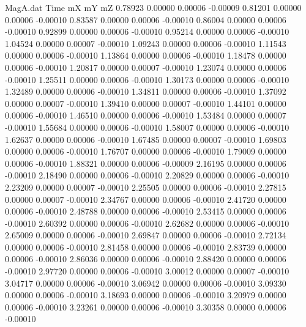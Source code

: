 \begin{filecontents}{MagA.dat}
Time mX mY mZ
   0.78923    0.00000    0.00006   -0.00009
   0.81201    0.00000    0.00006   -0.00010
   0.83587    0.00000    0.00006   -0.00010
   0.86004    0.00000    0.00006   -0.00010
   0.92899    0.00000    0.00006   -0.00010
   0.95214    0.00000    0.00006   -0.00010
   1.04524    0.00000    0.00007   -0.00010
   1.09243    0.00000    0.00006   -0.00010
   1.11543    0.00000    0.00006   -0.00010
   1.13864    0.00000    0.00006   -0.00010
   1.18478    0.00000    0.00006   -0.00010
   1.20817    0.00000    0.00007   -0.00010
   1.23074    0.00000    0.00006   -0.00010
   1.25511    0.00000    0.00006   -0.00010
   1.30173    0.00000    0.00006   -0.00010
   1.32489    0.00000    0.00006   -0.00010
   1.34811    0.00000    0.00006   -0.00010
   1.37092    0.00000    0.00007   -0.00010
   1.39410    0.00000    0.00007   -0.00010
   1.44101    0.00000    0.00006   -0.00010
   1.46510    0.00000    0.00006   -0.00010
   1.53484    0.00000    0.00007   -0.00010
   1.55684    0.00000    0.00006   -0.00010
   1.58007    0.00000    0.00006   -0.00010
   1.62637    0.00000    0.00006   -0.00010
   1.67485    0.00000    0.00007   -0.00010
   1.69803    0.00000    0.00006   -0.00010
   1.76707    0.00000    0.00006   -0.00010
   1.79009    0.00000    0.00006   -0.00010
   1.88321    0.00000    0.00006   -0.00009
   2.16195    0.00000    0.00006   -0.00010
   2.18490    0.00000    0.00006   -0.00010
   2.20829    0.00000    0.00006   -0.00010
   2.23209    0.00000    0.00007   -0.00010
   2.25505    0.00000    0.00006   -0.00010
   2.27815    0.00000    0.00007   -0.00010
   2.34767    0.00000    0.00006   -0.00010
   2.41720    0.00000    0.00006   -0.00010
   2.48788    0.00000    0.00006   -0.00010
   2.53415    0.00000    0.00006   -0.00010
   2.60392    0.00000    0.00006   -0.00010
   2.62682    0.00000    0.00006   -0.00010
   2.65009    0.00000    0.00006   -0.00010
   2.69847    0.00000    0.00006   -0.00010
   2.72134    0.00000    0.00006   -0.00010
   2.81458    0.00000    0.00006   -0.00010
   2.83739    0.00000    0.00006   -0.00010
   2.86036    0.00000    0.00006   -0.00010
   2.88420    0.00000    0.00006   -0.00010
   2.97720    0.00000    0.00006   -0.00010
   3.00012    0.00000    0.00007   -0.00010
   3.04717    0.00000    0.00006   -0.00010
   3.06942    0.00000    0.00006   -0.00010
   3.09330    0.00000    0.00006   -0.00010
   3.18693    0.00000    0.00006   -0.00010
   3.20979    0.00000    0.00006   -0.00010
   3.23261    0.00000    0.00006   -0.00010
   3.30358    0.00000    0.00006   -0.00010

\end{filecontents}
